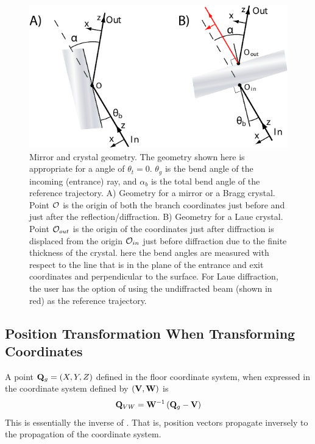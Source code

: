 \begin{figure}
  \centering \includegraphics{mirror.pdf} 
\caption[Mirror and crystal geometry] {Mirror and crystal geometry.  The geometry shown here is
appropriate for a  angle of $\theta_t = 0$.  $\theta_g$ is the bend angle of the
incoming (entrance) ray, and $\alpha_b$ is the total bend angle of the reference trajectory. A)
Geometry for a mirror or a Bragg crystal. Point ${\cal O}$ is the origin of both the branch coordinates
just before and just after the reflection/diffraction. B) Geometry for a Laue crystal.  Point
${\cal O}_{out}$ is the origin of the coordinates just after diffraction is displaced from the origin
${\cal O}_{in}$ just before diffraction due to the finite thickness of the crystal. here the bend
angles are measured with respect to the line that is in the plane of the entrance and exit
coordinates and perpendicular to the surface. For Laue diffraction, the user has the option of using
the undiffracted beam (shown in red) as the reference trajectory.
  }  
  \label{f:mirror}
\end{figure}

\subsection{Position Transformation When Transforming Coordinates}
\label{s:pos.trans}

A point ${\bf Q}_g = (X, Y, Z)$ defined in the floor coordinate system, when expressed in the
coordinate system defined by $({\bf V}, {\bf W})$ is
\begin{equation}
  {\bf Q}_{VW} = {\bf W}^{-1} \left( {\bf Q}_g - {\bf V} \right)
  \label{rwrv}
\end{equation}
This is essentially the inverse of . That is, position vectors propagate inversely to the
propagation of the coordinate system.

